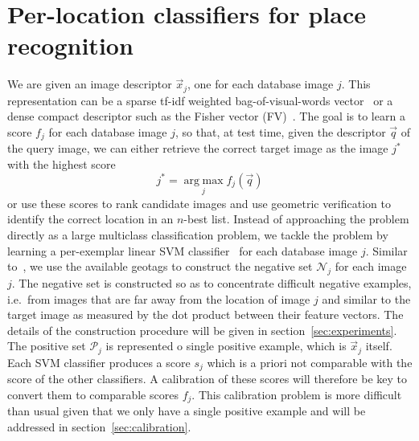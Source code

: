 \section{Per-location classifiers for place recognition}
\label{sec:classifiers}
   We are given an image descriptor $\vec{x}_j$, one for each database image $j$. This representation can be a sparse tf-idf weighted bag-of-visual-words vector~\cite{Sivic03} or a dense compact descriptor such as the Fisher vector (FV)~\cite{Jegou12}. The goal is to learn a score $f_j$ for each database image $j$, so that, at test time, given the descriptor $\vec{q}$ of the query image, we can either retrieve the correct target image as the image $j^*$ with the highest score
   \begin{equation}
   \label{eq:class}
    j^*=\operatorname*{arg\;max}_{j} f_j(\vec{q}) 
   \end{equation}
   \noindent
   or use these scores to rank candidate images and use geometric verification to identify the correct location in an $n$-best list.
   Instead of approaching the problem directly as a large multiclass classification problem, we tackle the problem by learning a per-exemplar linear SVM classifier~\cite{Malisiewicz11}  for each database image $j$.
   Similar to~\cite{Knopp2010}, we use the available geotags to construct the negative set $\mathcal N_j$ for each image $j$. The negative set is constructed so as to concentrate difficult negative examples, i.e.\ from images that are far away from the location of image $j$ and similar to the target image as measured by the dot product between their feature vectors. The details of the construction procedure will be given in section~\ref{sec:experiments}.  The positive set $\mathcal P_j$ is represented o single positive example, which is $\vec{x}_j$ itself. 
   Each SVM classifier produces a score $s_j$ which is a priori not comparable with the score of the other classifiers. A calibration of these scores will therefore be key to convert them to comparable scores $f_j$. This calibration problem is more difficult than usual given that we only have a single positive example and will be addressed in section~\ref{sec:calibration}.
   
